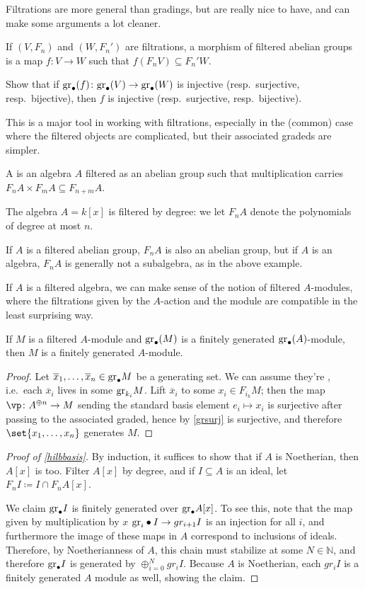 Filtrations are more general than gradings, but are really nice to have, and can make some arguments a lot cleaner.
\begin{defn}
If $(V, F_n)$ and $(W, F_n')$ are filtrations, a morphism of filtered abelian groups is a map $f\colon V\to W$ such
that $f(F_nV)\subseteq F_n'W$.
\end{defn}
\begin{ex}
\label{grsurj}
Show that if $\mathrm{gr}_\bullet(f)\colon\mathrm{gr}_\bullet(V)\to\mathrm{gr}_\bullet(W)$ is injective (resp.\ surjective, resp.\
bijective), then $f$ is injective (resp.\ surjective, resp.\ bijective).
\end{ex}
This is a major tool in working with filtrations, especially in the (common) case where the filtered objects are
complicated, but their associated gradeds are simpler.
\begin{defn}
A  is an algebra $A$ filtered as an abelian group such that multiplication carries
$F_nA\times F_mA\subseteq F_{n+m}A$.
\end{defn}
\begin{exm}
The algebra $A = k[x]$ is filtered by degree: we let $F_nA$ denote the polynomials of degree at most $n$.
\end{exm}
If $A$ is a filtered abelian group, $F_nA$ is also an abelian group, but if $A$ is an algebra, $F_nA$ is generally
not a subalgebra, as in the above example.

If $A$ is a filtered algebra, we can make sense of the notion of filtered $A$-modules, where the filtrations given
by the $A$-action and the module are compatible in the least surprising way.
\begin{lem}
If $M$ is a filtered $A$-module and $\mathrm{gr}_\bullet(M)$ is a finitely generated $\mathrm{gr}_\bullet(A)$-module, then $M$ is a
finitely generated $A$-module.
\end{lem}
\begin{proof}
Let $\overline x_1,\dotsc,\overline x_n\in\mathrm{gr}_\bullet M$ be a generating set. We can assume they're
\term{homogeneous}, i.e.\ each $\overline x_i$ lives in some $\mathrm{gr}_{k_i}M$. Lift $\overline x_i$ to some $x_i\in
F_{i_k}M$; then the map $\vp\colon A^{\oplus n}\to M$ sending the standard basis element $e_i\mapsto x_i$ is
surjective after passing to the associated graded, hence by \cref{grsurj} is surjective, and therefore
$\set{x_1,\dotsc,x_n}$ generates $M$.
\end{proof}
\begin{proof}[Proof of \cref{hilbbasis}]
By induction, it suffices to show that if $A$ is Noetherian, then $A[x]$ is too. Filter $A[x]$ by degree, and if
$I\subseteq A$ is an ideal, let $F_nI\coloneqq I\cap F_nA[x]$.

We claim $\mathrm{gr}_\bullet I$ is finitely generated over $\mathrm{gr}_\bullet A[x]$. To see this, note that the map given by multiplication by $x$ $\mathrm{gr}_i\bullet I \to gr_{i + 1}I$ is an injection for all $i$, and furthermore the image of these maps in $A$ correspond to inclusions of ideals. Therefore, by Noetherianness of $A$, this chain must stabilize at some $N \in \mathbb{N}$, and therefore $\mathrm{gr}_\bullet I$ is generated by $\oplus_{i = 0}^Ngr_iI$. Because $A$ is Noetherian, each $gr_iI$ is a finitely generated $A$ module as well, showing the claim.  
\end{proof}
